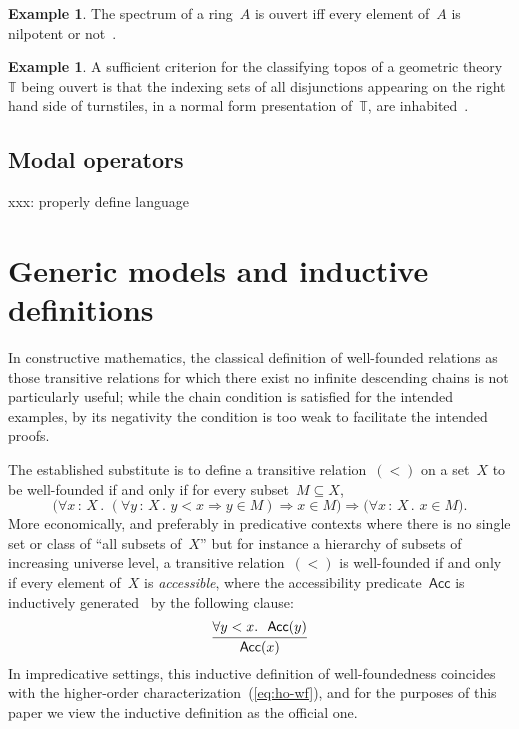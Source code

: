 \documentclass[oneside,reqno]{amsart}
\theoremstyle{definition}
\newtheorem{ex}[defn]{Example}
\theoremstyle{plain}
\theoremstyle{remark}
\newcommand{\TT}{\mathbb{T}}
\renewcommand{\_}{\mathpunct{.}\,}
\newcommand{\?}{\,{:}\,}
\begin{document}
\begin{ex}The spectrum of a ring~$A$ is ouvert iff every element of~$A$ is
nilpotent or not~\cite[Proposition~12.51]{blechschmidt:phd}.\end{ex}

\begin{ex}A sufficient criterion for the classifying topos of a geometric
theory~$\TT$ being ouvert is that the indexing sets of all disjunctions
appearing on the right hand side of turnstiles, in a normal form presentation
of~$\TT$, are inhabited~\cite{xxx}.\end{ex}


\subsection{Modal operators}

xxx: properly define language


\section{Generic models and inductive definitions}
\label{sect:generic-models}

In constructive mathematics, the classical definition of well-founded relations
as those transitive relations for which there exist no infinite descending
chains is not particularly useful; while the chain condition is satisfied for
the intended examples, by its negativity the condition is too weak to
facilitate the intended proofs.

The established substitute is to define a transitive relation~$({<})$ on a set~$X$ to
be well-founded if and only if for every subset~$M \subseteq X$,
\begin{equation}\label{eq:ho-wf}\tag{$\star$}
\bigl(\forall x\?X\_ (\forall y\?X\_ y < x \Rightarrow y \in M) \Rightarrow x \in
M\bigr) \Longrightarrow \bigl(\forall x\?X\_ x \in M\bigr).
\end{equation}
More economically, and preferably in predicative contexts where there is no
single set or class of ``all subsets of~$X$'' but for instance a
hierarchy of subsets of increasing universe level, a transitive relation~$({<})$ is
well-founded if and only if every element of~$X$ is \emph{accessible}, where
the accessibility predicate~$\mathsf{Acc}$ is inductively generated~\cite{xxx}
by the following clause:
\[
  \infer{\mathsf{Acc}(x)}{\forall y<x\_\ \mathsf{Acc}(y)}
\]
In impredicative settings, this inductive definition of well-foundedness
coincides with the higher-order characterization~(\ref{eq:ho-wf}), and for the
purposes of this paper we view the inductive definition as the official one.
\end{document}
